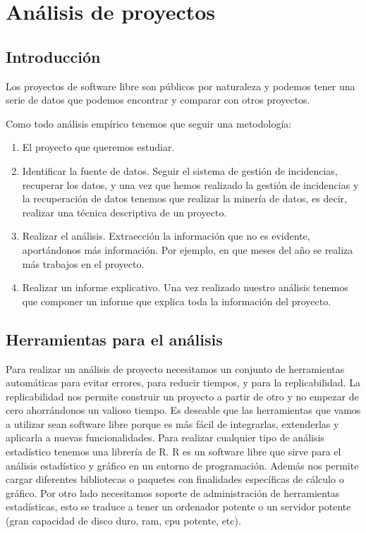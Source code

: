 \chapter{An\'alisis de proyectos}
\label{CHAP6:Analysis}
\section{Introducci\'on}
Los proyectos de software libre son p\'ublicos por naturaleza y podemos tener una serie de datos que podemos encontrar y comparar con otros proyectos.

Como todo an\'alisis emp\'irico tenemos que seguir una metodolog\'ia:
\begin{enumerate}
\item
El proyecto que queremos estudiar.
\item
Identificar la fuente de datos. Seguir el sistema de gesti\'on de incidencias, recuperar los datos, y una vez que hemos realizado la gesti\'on de incidencias y la recuperaci\'on de datos tenemos que realizar la miner\'ia de datos, es decir, realizar una t\'ecnica descriptiva de un proyecto.
\item
Realizar el an\'alisis. Extraecci\'on la informaci\'on que no es evidente, aport\'andonos m\'as informaci\'on. Por ejemplo, en que meses del a\~no se realiza m\'as trabajos en el proyecto.
\item
Realizar un informe explicativo. Una vez realizado nuestro an\'alisis tenemos que componer un informe que explica toda la informaci\'on del proyecto.
\end{enumerate}

\section{Herramientas para el an\'alisis}
Para realizar un an\'alisis de proyecto necesitamos un conjunto de herramientas autom\'aticas para evitar errores, para reducir tiempos, y para la replicabilidad. La replicabilidad nos permite construir un proyecto a partir de otro y no empezar de cero ahorr\'andonos un valioso tiempo. 
Es deseable que las herramientas que vamos a utilizar sean software libre porque es m\'as f\'acil de integrarlas, extenderlas y aplicarla a nuevas funcionalidades. 
Para realizar cualquier tipo de an\'alisis estad\'istico tenemos una librer\'ia de R. R es un software libre que sirve para el análisis estad\'istico y gr\'afico en un entorno de programaci\'on. Adem\'as nos permite cargar diferentes bibliotecas o paquetes con finalidades espec\'ificas de c\'alculo o gr\'afico. 
Por otro lado necesitamos soporte de administraci\'on de herramientas estad\'isticas, esto se traduce a tener un ordenador potente o un servidor potente (gran capacidad de disco duro, ram, cpu potente, etc).

